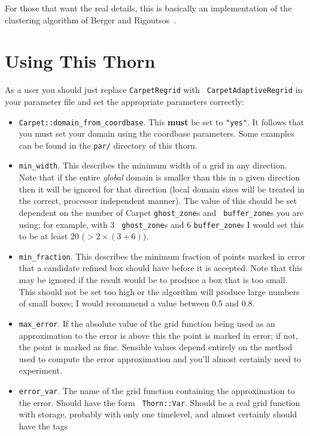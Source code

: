 For those that want the real details, this is basically an
implementation of the clustering algorithm of Berger and
Rigoutsos~\cite{CAR_Berger91}.

\section{Using This Thorn}

As a user you should just replace {\tt CarpetRegrid} with {\tt
  CarpetAdaptiveRegrid} in your parameter file and set the appropriate
parameters correctly:
\begin{itemize}
\item {\tt Carpet::domain\_from\_coordbase}. This {\bf must} be set to
  {\tt "yes"}. It follows that you must set your domain using the
  coordbase parameters. Some examples can be found in the {\tt par/}
  directory of this thorn.
\item {\tt min\_width}. This describes the minimum width of a grid in
  any direction. Note that if the entire {\em global} domain is
  smaller than this in a given direction then it will be ignored for
  that direction (local domain sizes will be treated in the correct,
  processor independent manner). The value of this should be set
  dependent on the number of Carpet {\tt ghost\_zone}s and {\tt
    buffer\_zone}s you are using; for example, with 3 {\tt
    ghost\_zone}s and 6 {\tt buffer\_zone}s I would set this to be at
  least 20 ($> 2 \times (3+6)$).
\item {\tt min\_fraction}. This describes the minimum fraction of
  points marked in error that a candidate refined box should have
  before it is accepted. Note that this may be ignored if the result
  would be to produce a box that is too small. This should not be set
  too high or the algorithm will produce large numbers of small boxes;
  I would recommend a value between 0.5 and 0.8.
\item {\tt max\_error}. If the absolute value of the grid function
  being used as an approximation to the error is above this the point
  is marked in error; if not, the point is marked as fine. Sensible
  values depend entirely on the method used to compute the error
  approximation and you'll almost certainly need to experiment.
\item {\tt error\_var}. The name of the grid function containing the
  approximation to the error. Should have the form {\tt
    Thorn::Var}. Should be a real grid function with storage, probably
  with only one timelevel, and almost certainly should have the tags

\end{itemize}
